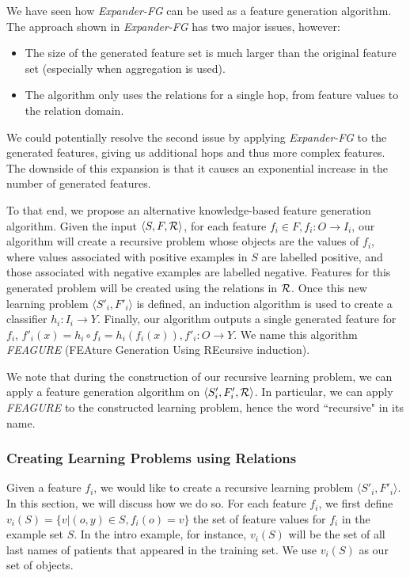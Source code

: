 \documentclass[twoside,11pt]{article}
\theoremstyle{definition}
\begin{document}
We have seen how \emph{Expander-FG} can be used as a feature generation algorithm.
The approach shown in \emph{Expander-FG} has two major issues, however:
\begin{itemize}
	\item The size of the generated feature set is much larger than the original feature set (especially when aggregation is used).
	\item The algorithm only uses the relations for a single hop, from feature values to the relation domain.
\end{itemize}
We could potentially resolve the second issue by applying \emph{Expander-FG} to the generated features, giving us additional hops and thus more complex features. The downside of this expansion is that it causes an exponential increase in the number of generated features.

To that end, we propose an alternative knowledge-based feature generation algorithm. Given the input $\langle S,F,{\cal R} \rangle$, for each feature $f_i\in F, f_i:O\rightarrow I_i$, our algorithm will create a recursive problem whose objects are the values of $f_i$, where values associated with positive examples in $S$ are labelled positive, and those associated with negative examples are labelled negative. Features for this generated problem will be created using the relations in ${\cal R}$. Once this new learning problem $\langle S'_i,F'_i\rangle$ is defined, an induction algorithm is used to create a classifier $h_i:I_i\rightarrow Y$. Finally, our algorithm outputs a single generated feature for $f_i$, $f'_i(x)=h_i\circ f_i=h_i(f_i(x)), f'_i:O\rightarrow Y$.
We name this algorithm \emph{FEAGURE} (FEAture Generation Using REcursive induction).

We note that during the construction of our recursive learning problem, we can apply a feature generation algorithm on $\langle S'_i,F'_i,{\cal R} \rangle$. In particular, we can apply \emph{FEAGURE} to the constructed learning problem, hence the word ``recursive" in its name.

\subsubsection{Creating Learning Problems using Relations}  

Given a feature $f_{i}$, we would like to create a recursive learning problem $\langle S'_i,F'_i \rangle$. In this section, we will discuss how we do so.
For each feature $f_{i}$, we first define $v_i(S) = \{v | (o,y) \in S, f_{i}(o)=v\}$ the set of feature values for $f_i$ in the example set $S$. In the intro example, for instance, $v_i(S)$ will be the set of all last names of patients that appeared in the training set.
We use $v_i(S)$ as our set of objects.
\end{document}
